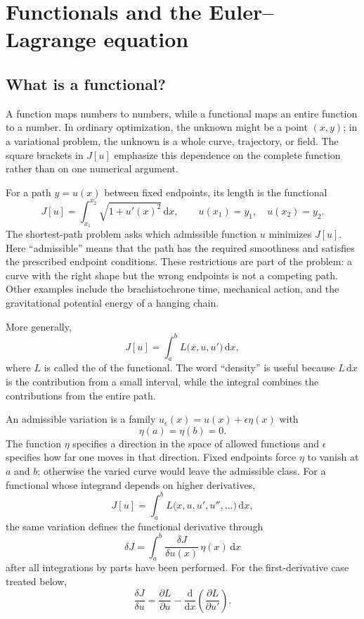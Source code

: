 \section{Functionals and the Euler--Lagrange equation}

\subsection{What is a functional?}
A function maps numbers to numbers, while a functional maps an entire function to a number. In ordinary optimization, the unknown might be a point $(x,y)$; in a variational problem, the unknown is a whole curve, trajectory, or field. The square brackets in $J[u]$ emphasize this dependence on the complete function rather than on one numerical argument.

For a path $y=u(x)$ between fixed endpoints, its length is the functional
\begin{equation}
J[u]=\int_{x_1}^{x_2}\sqrt{1+u'(x)^2}\,\mathrm{d}x,
\qquad
u(x_1)=y_1,\quad u(x_2)=y_2.
\end{equation}
The shortest-path problem asks which admissible function $u$ minimizes $J[u]$. Here ``admissible'' means that the path has the required smoothness and satisfies the prescribed endpoint conditions. These restrictions are part of the problem: a curve with the right shape but the wrong endpoints is not a competing path. Other examples include the brachistochrone time, mechanical action, and the gravitational potential energy of a hanging chain.

More generally,
\begin{equation}
J[u]=\int_a^b L\bigl(x,u,u'\bigr)\,\mathrm{d}x,
\end{equation}
where $L$ is called the  of the functional. The word ``density'' is useful because $L\,\mathrm{d}x$ is the contribution from a small interval, while the integral combines the contributions from the entire path.

An admissible variation is a family $u_\epsilon(x)=u(x)+\epsilon\eta(x)$ with
\begin{equation}
\eta(a)=\eta(b)=0.
\end{equation}
The function $\eta$ specifies a direction in the space of allowed functions and $\epsilon$ specifies how far one moves in that direction. Fixed endpoints force $\eta$ to vanish at $a$ and $b$; otherwise the varied curve would leave the admissible class. For a functional whose integrand depends on higher derivatives,
\begin{equation}
J[u]=\int_a^b L\bigl(x,u,u',u'',\ldots\bigr)\,\mathrm{d}x,
\end{equation}
the same variation defines the functional derivative through
\begin{equation}
\delta J=\int_a^b\frac{\delta J}{\delta u(x)}\,\eta(x)\,\mathrm{d}x
\end{equation}
after all integrations by parts have been performed. For the first-derivative case treated below,
\begin{equation}
\frac{\delta J}{\delta u}
=\frac{\partial L}{\partial u}
-\frac{\mathrm{d}}{\mathrm{d}x}\left(\frac{\partial L}{\partial u'}\right).
\end{equation}

